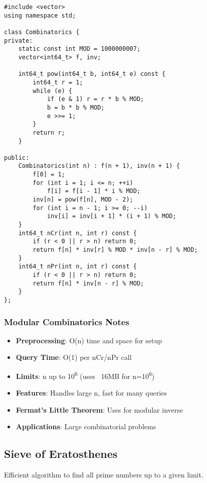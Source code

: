 \documentclass[11pt,a4paper]{article}
\begin{document}
\newpage
\begin{lstlisting}[caption={Combinatorics with Modular Arithmetic}]
#include <vector>
using namespace std;

class Combinatorics {
private:
    static const int MOD = 1000000007;
    vector<int64_t> f, inv;
    
    int64_t pow(int64_t b, int64_t e) const {
        int64_t r = 1;
        while (e) {
            if (e & 1) r = r * b % MOD;
            b = b * b % MOD;
            e >>= 1;
        }
        return r;
    }

public:
    Combinatorics(int n) : f(n + 1), inv(n + 1) {
        f[0] = 1;
        for (int i = 1; i <= n; ++i)
            f[i] = f[i - 1] * i % MOD;
        inv[n] = pow(f[n], MOD - 2);
        for (int i = n - 1; i >= 0; --i)
            inv[i] = inv[i + 1] * (i + 1) % MOD;
    }
    int64_t nCr(int n, int r) const {
        if (r < 0 || r > n) return 0;
        return f[n] * inv[r] % MOD * inv[n - r] % MOD;
    }
    int64_t nPr(int n, int r) const {
        if (r < 0 || r > n) return 0;
        return f[n] * inv[n - r] % MOD;
    }
};
\end{lstlisting}

\subsubsection{Modular Combinatorics Notes}
\begin{itemize}
\item \textbf{Preprocessing}: O(n) time and space for setup
\item \textbf{Query Time}: O(1) per nCr/nPr call
\item \textbf{Limits}: n up to 10\textsuperscript{6} (uses ~16MB for n=10\textsuperscript{6})
\item \textbf{Features}: Handles large n, fast for many queries
\item \textbf{Fermat's Little Theorem}: Uses for modular inverse
\item \textbf{Applications}: Large combinatorial problems
\end{itemize}

\newpage
\subsection{Sieve of Eratosthenes}
Efficient algorithm to find all prime numbers up to a given limit.
\end{document}
